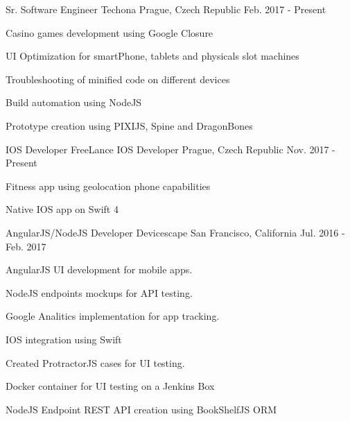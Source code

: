 

\begin{cventries}

 \cventry
      {Sr. Software Engineer} %
      {Techona} %
      {Prague, Czech Republic} %
      {Feb. 2017 - Present} %
      {
        \begin{cvitems} %
          \item {Casino games development using Google Closure}
          \item {UI Optimization for smartPhone, tablets and physicals slot machines}
          \item {Troubleshooting of minified code on different devices}
          \item {Build automation using NodeJS}
          \item {Prototype creation using PIXIJS, Spine and DragonBones}
        \end{cvitems}
      }

 \cventry
      {IOS Developer} %
      {FreeLance IOS Developer} %
      {Prague, Czech Republic} %
      {Nov. 2017 - Present} %
      {
        \begin{cvitems} %
          \item {Fitness app using geolocation phone capabilities}
          \item {Native IOS app on Swift 4}
        \end{cvitems}
      }

  \cventry
      {AngularJS/NodeJS Developer} %
      {Devicescape} %
      {San Francisco, California} %
      {Jul. 2016 - Feb. 2017} %
      {
        \begin{cvitems} %
          \item {AngularJS UI development for mobile apps.}
          \item {NodeJS endpoints mockups for API testing.}
          \item {Google Analitics implementation for app tracking.}
          \item {IOS integration using Swift}
          \item {Created ProtractorJS cases for UI testing.}
          \item {Docker container for UI testing on a Jenkins Box}
          \item {NodeJS Endpoint REST API creation using BookShelfJS ORM}
        \end{cvitems}
      }



\end{cventries}
